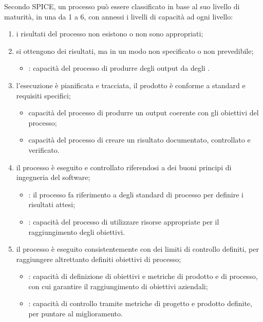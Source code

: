 Secondo SPICE, un processo può essere classificato in base al suo livello di maturità, in una  da 1 a 6, con annessi i livelli di capacità ad ogni livello:
\begin{enumerate}
\setcounter{enumi}{0}
\item {} i risultati del processo non esistono o non sono appropriati;
\item {} si ottengono dei risultati, ma in un modo non specificato o non prevedibile;
\begin{itemize}
\item {}: capacità del processo di produrre degli output da degli .
\end{itemize}
\item  {} l'esecuzione è pianificata e tracciata, il prodotto è conforme a standard e requisiti specifici;
\begin{itemize}
\item {} capacità del processo di produrre un output coerente con gli obiettivi del processo;
\item {} capacità del processo di creare un risultato documentato, controllato e verificato.
\end{itemize}
\item  {} il processo è eseguito e controllato riferendosi a dei buoni principi di ingegneria del software;
\begin{itemize}
\item {}: il processo fa riferimento a degli standard di processo per definire i risultati attesi;
\item {}: capacità del processo di utilizzare risorse appropriate per il raggiungimento degli obiettivi.
\end{itemize}
\item  {} il processo è eseguito consistentemente con dei limiti di controllo definiti, per raggiungere altrettanto definiti obiettivi di processo;
\begin{itemize}
\item {}: capacità di definizione di obiettivi e metriche di prodotto e di processo, con cui garantire il raggiungimento di obiettivi aziendali;
\item {}: capacità di controllo tramite metriche di progetto e prodotto definite, per puntare al miglioramento.

\end{itemize}
\end{enumerate}
